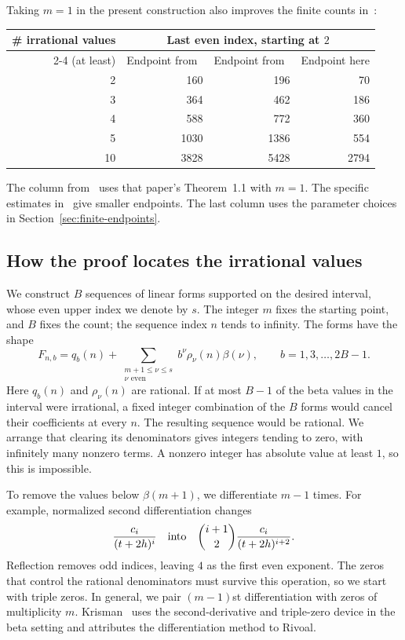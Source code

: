 Taking $m=1$ in the present construction also improves the
finite counts in~\cite{Tcount}:
\begin{center}
\begin{tabular}{@{}rrrr@{}}
\toprule
\# irrational values&\multicolumn{3}{c}{Last even index, starting at $2$}\\
\cmidrule(lr){2-4}
(at least)&Endpoint from~\cite{Tcount}&Endpoint from~\cite{TshiftV1}&Endpoint here\\
\midrule
2&160&196&70\\
3&364&462&186\\
4&588&772&360\\
5&1030&1386&554\\
10&3828&5428&2794\\
\bottomrule
\end{tabular}
\end{center}
The column from~\cite{TshiftV1} uses that paper's
Theorem~1.1 with $m=1$.
The specific estimates in~\cite{Tcount} give smaller endpoints.
The last column uses the parameter choices in
Section~\ref{sec:finite-endpoints}.

\subsection{How the proof locates the irrational values}

We construct $B$ sequences of linear forms supported on the
desired interval, whose even upper index we denote by $s$.
The integer $m$ fixes the starting point, and $B$ fixes the count;
the sequence index $n$ tends to infinity. The forms have the shape
\[
 F_{n,b}=q_b(n)+
 \sum_{\substack{m+1\le\nu\le s\\\nu\text{ even}}}
          b^\nu\rho_\nu(n)\beta(\nu),
 \qquad b=1,3,\ldots,2B-1.
\]
Here $q_b(n)$ and $\rho_\nu(n)$ are rational.
If at most $B-1$ of the beta values in the interval were irrational,
a fixed integer combination of the $B$ forms would cancel their coefficients at
every $n$. The resulting sequence would be rational. We arrange
that clearing its denominators gives integers tending to zero,
with infinitely many nonzero terms. A nonzero integer has
absolute value at least $1$, so this is impossible.

To remove the values below $\beta(m+1)$, we differentiate $m-1$
times. For example, normalized second differentiation changes
\[
 \frac{c_i}{(t+2h)^i}
 \quad\hbox{into}\quad
 \binom{i+1}{2}\frac{c_i}{(t+2h)^{i+2}}.
\]
Reflection removes odd indices, leaving $4$ as the first even
exponent. The zeros that control the rational denominators must
survive this operation, so we start with triple zeros. In general,
we pair $(m-1)$st differentiation with zeros of multiplicity $m$.
Krisman~\cite[Sections~2--4]{K26} uses the second-derivative and
triple-zero device in the beta setting and attributes the
differentiation method to Rivoal.

